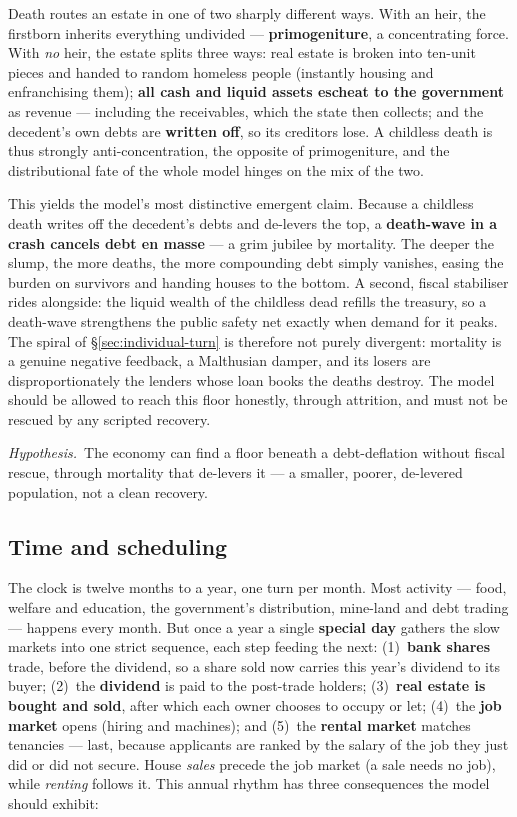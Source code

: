 \documentclass[11pt]{article}
\newcommand{\hyp}[1]{\medskip\noindent\textit{Hypothesis.}\ #1\medskip}
\begin{document}
Death routes an estate in one of two sharply different ways. With an heir, the
firstborn inherits everything undivided --- \textbf{primogeniture}, a
concentrating force. With \emph{no} heir, the estate splits three ways: real
estate is broken into ten-unit pieces and handed to random homeless people
(instantly housing and enfranchising them); \textbf{all cash and liquid assets
escheat to the government} as revenue --- including the receivables, which the
state then collects; and the decedent's own debts are \textbf{written off}, so
its creditors lose. A childless death is thus strongly anti-concentration, the
opposite of primogeniture, and the distributional fate of the whole model hinges
on the mix of the two.

This yields the model's most distinctive emergent claim. Because a childless
death writes off the decedent's debts and de-levers the top, a \textbf{death-wave
in a crash cancels debt en masse} --- a grim jubilee by mortality. The deeper the
slump, the more deaths, the more compounding debt simply vanishes, easing the
burden on survivors and handing houses to the bottom. A second, fiscal stabiliser
rides alongside: the liquid wealth of the childless dead refills the treasury, so
a death-wave strengthens the public safety net exactly when demand for it peaks.
The spiral of \S\ref{sec:individual-turn} is therefore not purely divergent:
mortality is a genuine negative feedback, a Malthusian damper, and its losers are
disproportionately the lenders whose loan books the deaths destroy. The model
should be allowed to reach this floor honestly, through attrition, and must not be
rescued by any scripted recovery.

\hyp The economy can find a floor beneath a debt-deflation without fiscal
rescue, through mortality that de-levers it --- a smaller, poorer, de-levered
population, not a clean recovery.

\subsection{Time and scheduling}
\label{sec:time}

The clock is twelve months to a year, one turn per month. Most activity ---
food, welfare and education, the government's distribution, mine-land and debt
trading --- happens every month. But once a year a single \textbf{special day}
gathers the slow markets into one strict sequence, each step feeding the next:
(1)~\textbf{bank shares} trade, before the dividend, so a share sold now carries
this year's dividend to its buyer; (2)~the \textbf{dividend} is paid to the
post-trade holders; (3)~\textbf{real estate is bought and sold}, after which each
owner chooses to occupy or let; (4)~the \textbf{job market} opens (hiring and
machines); and (5)~the \textbf{rental market} matches tenancies --- last, because
applicants are ranked by the salary of the job they just did or did not secure.
House \emph{sales} precede the job market (a sale needs no job), while
\emph{renting} follows it. This annual rhythm has three consequences the model
should exhibit:
\end{document}
